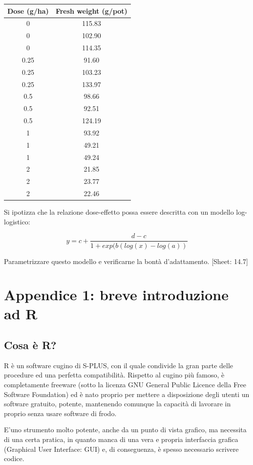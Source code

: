 \documentclass[a4paper,12pt,oneside]{book}
\begin{document}
\begin{longtable}[]{@{}cc@{}}
\toprule
Dose (g/ha) & Fresh weight (g/pot) \\
\midrule
\endhead
0 & 115.83 \\
0 & 102.90 \\
0 & 114.35 \\
0.25 & 91.60 \\
0.25 & 103.23 \\
0.25 & 133.97 \\
0.5 & 98.66 \\
0.5 & 92.51 \\
0.5 & 124.19 \\
1 & 93.92 \\
1 & 49.21 \\
1 & 49.24 \\
2 & 21.85 \\
2 & 23.77 \\
2 & 22.46 \\
\bottomrule
\end{longtable}

Si ipotizza che la relazione dose-effetto possa essere descritta con un modello log-logistico:

\[y = c + \frac{d - c}{1 + exp(b ( log (x) - log (a))}\]

Parametrizzare questo modello e verificarne la bontà d'adattamento.
{[}Sheet: 14.7{]}

\hypertarget{appendice-1-breve-introduzione-ad-r}{%
\chapter{Appendice 1: breve introduzione ad R}\label{appendice-1-breve-introduzione-ad-r}}

\hypertarget{cosa-uxe8-r}{%
\section*{Cosa è R?}\label{cosa-uxe8-r}}

R è un software cugino di S-PLUS, con il quale condivide la gran parte delle procedure ed una perfetta compatibilità. Rispetto al cugino più famoso, è completamente freeware (sotto la licenza GNU General Public Licence della Free Software Foundation) ed è nato proprio per mettere a disposizione degli utenti un software gratuito, potente, mantenendo comunque la capacità di lavorare in proprio senza usare software di frodo.

E'uno strumento molto potente, anche da un punto di vista grafico, ma necessita di una certa pratica, in quanto manca di una vera e propria interfaccia grafica (Graphical User Interface: GUI) e, di conseguenza, è spesso necessario scrivere codice.
\end{document}
